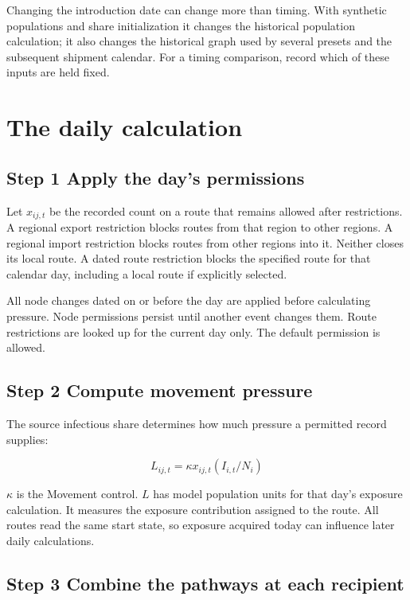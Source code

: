 \documentclass[11pt,a4paper]{article}
\begin{document}
Changing the introduction date can change more than timing. With
synthetic populations and share initialization it changes the historical
population calculation; it also changes the historical graph used by
several presets and the subsequent shipment calendar. For a timing
comparison, record which of these inputs are held fixed.

\section{The daily calculation}\label{the-daily-calculation}

\subsection{Step 1 Apply the day's
permissions}\label{step-1-apply-the-days-permissions}

Let \(x_{ij,t}\) be the recorded count on a route that remains allowed
after restrictions. A regional export restriction blocks routes from
that region to other regions. A regional import restriction blocks
routes from other regions into it. Neither closes its local route. A
dated route restriction blocks the specified route for that calendar
day, including a local route if explicitly selected.

All node changes dated on or before the day are applied before
calculating pressure. Node permissions persist until another event
changes them. Route restrictions are looked up for the current day only.
The default permission is allowed.

\subsection{Step 2 Compute movement
pressure}\label{step-2-compute-movement-pressure}

The source infectious share determines how much pressure a permitted
record supplies:

\[
L_{ij,t}=\kappa x_{ij,t}(I_{i,t}/N_i)
\]

\(\kappa \) is the Movement control. \(L\) has model population units
for that day's exposure calculation. It measures the exposure
contribution assigned to the route. All routes read the same start
state, so exposure acquired today can influence later daily
calculations.

\subsection{Step 3 Combine the pathways at each
recipient}\label{step-3-combine-the-pathways-at-each-recipient}
\end{document}
